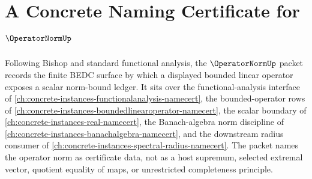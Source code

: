 \chapter{A Concrete Naming Certificate for $\OperatorNormUp$}
\label{ch:concrete-instances-operator-norm-namecert}

Following Bishop and standard functional analysis, the $\OperatorNormUp$ packet records the finite BEDC surface by which a displayed bounded linear operator exposes a scalar norm-bound ledger. It sits over the functional-analysis interface of \autoref{ch:concrete-instances-functionalanalysis-namecert}, the bounded-operator rows of \autoref{ch:concrete-instances-boundedlinearoperator-namecert}, the scalar boundary of \autoref{ch:concrete-instances-real-namecert}, the Banach-algebra norm discipline of \autoref{ch:concrete-instances-banachalgebra-namecert}, and the downstream radius consumer of \autoref{ch:concrete-instances-spectral-radius-namecert}. The packet names the operator norm as certificate data, not as a host supremum, selected extremal vector, quotient equality of maps, or unrestricted completeness principle.


